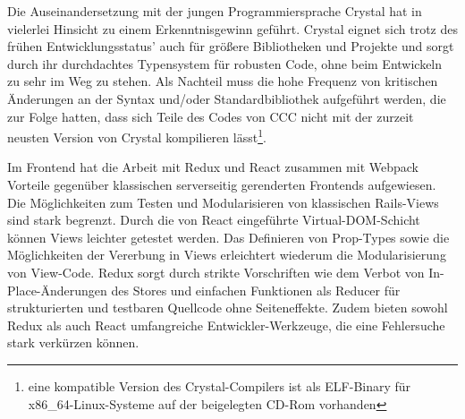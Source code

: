 Die Auseinandersetzung mit der jungen Programmiersprache Crystal hat in vielerlei
Hinsicht zu einem Erkenntnisgewinn geführt.  Crystal eignet sich trotz des
frühen Entwicklungsstatus' auch für größere Bibliotheken und Projekte und sorgt
durch ihr durchdachtes Typensystem für robusten Code, ohne beim Entwickeln zu
sehr im Weg zu stehen.  Als Nachteil muss die hohe Frequenz von kritischen
Änderungen an der Syntax und/oder Standardbibliothek aufgeführt werden, die zur
Folge hatten, dass sich Teile des Codes von CCC nicht mit der zurzeit neusten
Version von Crystal kompilieren lässt\footnote{eine kompatible Version des
Crystal-Compilers ist als ELF-Binary für x86\_64-Linux-Systeme auf der
beigelegten CD-Rom vorhanden}.

Im Frontend hat die Arbeit mit Redux und React zusammen mit Webpack Vorteile
gegenüber klassischen serverseitig gerenderten Frontends aufgewiesen.  Die
Möglichkeiten zum Testen und Modularisieren von klassischen Rails-Views sind
stark begrenzt.  Durch die von React eingeführte Virtual-DOM-Schicht können
Views leichter getestet werden.  Das Definieren von Prop-Types sowie die
Möglichkeiten der Vererbung in Views erleichtert wiederum die Modularisierung
von View-Code.  Redux sorgt durch strikte Vorschriften wie dem Verbot von 
In-Place-Änderungen des Stores und einfachen Funktionen als Reducer für
strukturierten und testbaren Quellcode ohne Seiteneffekte.  Zudem bieten sowohl
Redux als auch React umfangreiche Entwickler-Werkzeuge, die eine Fehlersuche
stark verkürzen können.
